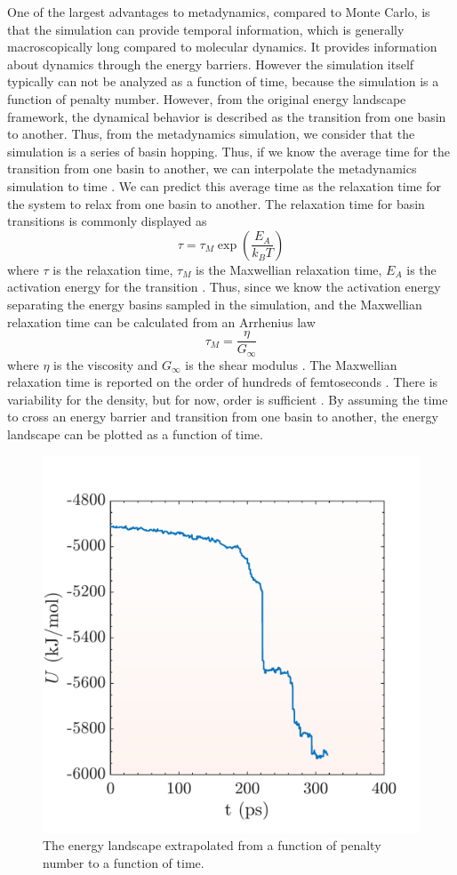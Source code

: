 One of the largest advantages to metadynamics, compared to Monte Carlo, is that the simulation can provide temporal information, which is generally macroscopically long compared to molecular dynamics.  It provides information about dynamics through the energy barriers.  However the simulation itself typically can not be analyzed as a function of time, because the simulation is a function of penalty number.  However, from the original energy landscape framework, the dynamical behavior is described as the transition from one basin to another.  Thus, from the metadynamics simulation, we consider that the simulation is a series of basin hopping.  Thus, if we know the average time for the transition from one basin to another, we can interpolate the metadynamics simulation to time \cite{Cavagna2009}.  We can predict this average time as the relaxation time for the system to relax from one basin to another.  The relaxation time for basin transitions is commonly displayed as
\begin{equation}
\tau = \tau_M\exp\left( \frac{E_A}{k_BT}\right)
\end{equation}
where $\tau$ is the relaxation time, $\tau_M$ is the Maxwellian relaxation time, $E_A$ is the activation energy for the transition \cite{Dexter2009}.  Thus, since we know the activation energy separating the energy basins sampled in the simulation, and the Maxwellian relaxation time can be calculated from an Arrhenius law
\begin{equation}
	\tau_M = \frac{\eta}{G_\infty}
\end{equation}
where $\eta$ is the viscosity and $G_\infty$ is the shear modulus \cite{Dexter2009}. The Maxwellian relaxation time is reported on the order of hundreds of femtoseconds \cite{Dexter2009}.  There is variability for the density, but for now, order is sufficient \cite{Dexter2009}.  By assuming the time to cross an energy barrier and transition from one basin to another, the energy landscape can be plotted as a function of time.

\begin{figure}[h]
	\centering
	\includegraphics[width=.45\textwidth]{./Figures/Nucleation/high_density/time.pdf}
	\caption{The energy landscape extrapolated from a function of penalty number to a function of time.}
	\label{time}
\end{figure}


